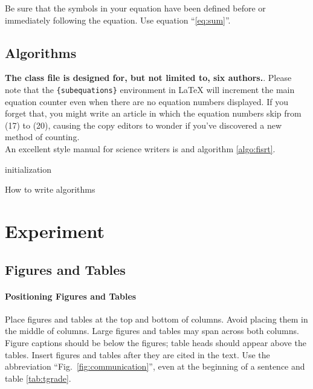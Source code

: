 \documentclass[conference]{IEEEtran}
\begin{document}
		Be sure that the 
		symbols in your equation have been defined before or immediately following 
		the equation. Use equation ``\ref{eq:sum}''.

	\subsection{Algorithms}\label{SCM}
		\textbf{The class file is designed for, but not limited to, six authors.}.
		Please note that the \verb|{subequations}| environment in {\LaTeX}
		will increment the main equation counter even when there are no
		equation numbers displayed. If you forget that, you might write an
		article in which the equation numbers skip from (17) to (20), causing
		the copy editors to wonder if you've discovered a new method of
		counting. \\
		An excellent style manual for science writers is \cite{cuevas2013} and algorithm \ref{algo:fisrt}.
		
		\begin{algorithm}
			\SetAlgoLined

			initialization\;
			\caption{How to write algorithms}
			\label{algo:fisrt}
		\end{algorithm}

\section{Experiment}
	\subsection{Figures and Tables}
		\paragraph{Positioning Figures and Tables} Place figures and tables at the top and 
		bottom of columns. Avoid placing them in the middle of columns. Large 
		figures and tables may span across both columns. Figure captions should be 
		below the figures; table heads should appear above the tables. Insert 
		figures and tables after they are cited in the text. Use the abbreviation 
		``Fig.~\ref{fig:communication}'', even at the beginning of a sentence and table \ref{tab:tgrade}.
\end{document}
